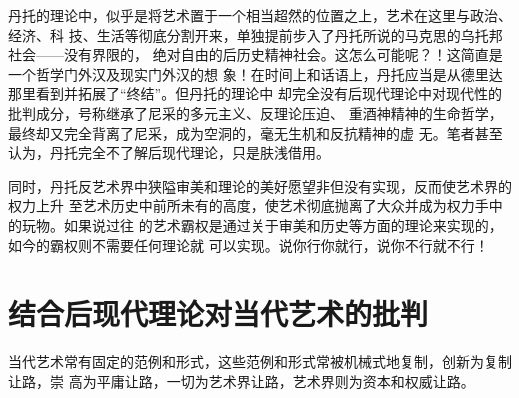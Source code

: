 丹托的理论中，似乎是将艺术置于一个相当超然的位置之上，艺术在这里与政治、经济、科
技、生活等彻底分割开来，单独提前步入了丹托所说的马克思的乌托邦社会——没有界限的，
绝对自由的后历史精神社会。这怎么可能呢？！这简直是一个哲学门外汉及现实门外汉的想
象！在时间上和话语上，丹托应当是从德里达那里看到并拓展了“终结”。但丹托的理论中
却完全没有后现代理论中对现代性的批判成分，号称继承了尼采的多元主义、反理论压迫、
重酒神精神的生命哲学，最终却又完全背离了尼采，成为空洞的，毫无生机和反抗精神的虚
无。笔者甚至认为，丹托完全不了解后现代理论，只是肤浅借用。

同时，丹托反艺术界中狭隘审美和理论的美好愿望非但没有实现，反而使艺术界的权力上升
至艺术历史中前所未有的高度，使艺术彻底抛离了大众并成为权力手中的玩物。如果说过往
的艺术霸权是通过关于审美和历史等方面的理论来实现的，如今的霸权则不需要任何理论就
可以实现。说你行你就行，说你不行就不行！

\section{结合后现代理论对当代艺术的批判}

当代艺术常有固定的范例和形式，这些范例和形式常被机械式地复制，创新为复制让路，崇
高为平庸让路，一切为艺术界让路，艺术界则为资本和权威让路。

